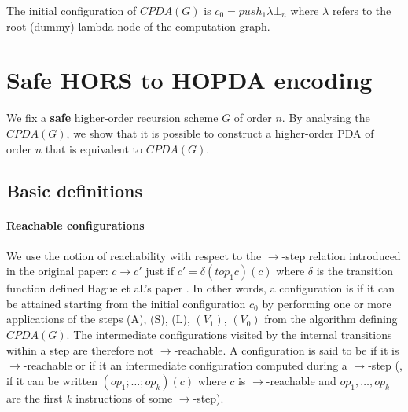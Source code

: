 \documentclass[a4paper,draft]{article}
\theoremstyle{remark}
\theoremstyle{definition}
\begin{document}
The initial configuration of $CPDA(G)$ is $c_0 = push_1 \lambda \bot_n$
where $\lambda$ refers to the root (dummy) lambda node of the computation graph.

\section{Safe HORS to HOPDA encoding}

We fix a {\bf safe} higher-order recursion scheme $G$ of order $n$.
By analysing the $CPDA(G)$, we show that it is possible to construct a higher-order PDA of order $n$ that is equivalent to $CPDA(G)$.


\subsection{Basic definitions}

\paragraph{Reachable configurations}
We use the notion of reachability with respect to the $\rightarrow$-step relation introduced in the original paper:
$c\rightarrow c'$ just if $c' = \delta(top_1 c)(c)$ where $\delta$ is the transition
function defined Hague et al.'s paper \cite[Figure 2]{hague-collaps-full}.
In other words, a configuration is  if it can be attained starting from the initial configuration $c_0$ by performing
one or more applications of the steps (A), (S), (L), $(V_1)$, $(V_0)$ from the algorithm defining $CPDA(G)$.
The intermediate configurations visited by the internal transitions within a step are therefore not $\rightarrow$-reachable.
A configuration is said to be  if it is $\rightarrow$-reachable or if it
an intermediate configuration computed during a $\rightarrow$-step
(\ie, if it can be written $(op_1;\ldots;op_k)(c)$ where $c$ is $\rightarrow$-reachable and
$op_1, \ldots, op_k$ are the first $k$ instructions of some $\rightarrow$-step).
\end{document}

